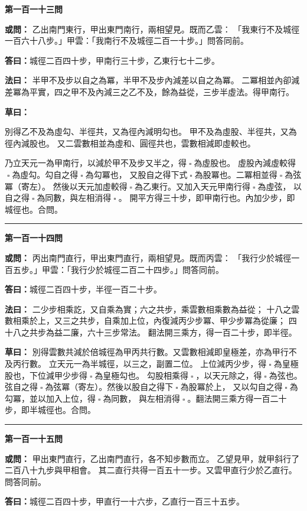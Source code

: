 \documentclass[11pt,a4paper]{article}
\let\origsquare\square
\renewcommand{\square}{\ensuremath{\origsquare}}%
\newcommand{\longline}{\noindent\rule{\textwidth}{0.4pt}}
\newcommand{\owen}[1]{%
  \par\vspace{0.4em}%
  \noindent\textcolor{problemcolor}{\textbf{或問：}}{\tradfont #1}\par\nopagebreak%
}
\newcommand{\fayue}[1]{%
  \par\noindent\textcolor{methodcolor}{\textbf{法曰：}}{\tradfont #1}\par\nopagebreak%
}
\newcommand{\tsaoyue}[1]{%
  \par\noindent\textcolor{workcolor}{\textbf{草曰：}}{\tradfont #1}\par%
}
\newcommand{\dayue}[1]{%
  \par\noindent\textcolor{anscolor}{\textbf{答曰：}}{\tradfont #1}\par\nopagebreak%
}
\newcommand{\wen}[1]{\par\vspace{0.3em}\noindent\textcolor{problemcolor}{\textbf{第#1問}}\par}
\begin{document}
\wen{一百一十三}
\owen{%
乙出南門東行，甲出東門南行，兩相望見。既而乙雲：
「我東行不及城徑一百六十八步。」甲雲：「我南行不及城徑二百一十步。」問答同前。}
\dayue{城徑二百四十步，甲南行三十步，乙東行七十二步。}

\fayue{%
半甲不及步以自之為冪，半甲不及步內減差以自之為冪。
二冪相並內卻減差冪為平實，四之甲不及內減三之乙不及，餘為益從，三步半虛法。得甲南行。}

\tsaoyue{%
別得乙不及為虛勾、半徑共，又為徑內減明勾也。
甲不及為虛股、半徑共，又為徑內減股也。
又二雲數相並為虛和、圓徑共也，雲數相減即虛較也。

乃立天元一為甲南行，以減於甲不及步又半之，得$ \; \square \; $為虛股也。
虛股內減虛較得$ \; \square \; $為虛勾。勾自之得$ \; \square \; $為勾冪也，
又股自之得下式$ \; \square \; $為股冪也。二冪相並得$ \; \square \; $為弦冪（寄左）。
然後以天元加虛較得$ \; \square \; $為乙東行。又加入天元甲南行得$ \; \square \; $為虛弦，
以自之得$ \; \square \; $為同數，與左相消得$ \; \square \; $。
開平方得三十步，即甲南行也。內加少步，即城徑也。合問。}

\vspace{0.5cm}
\begin{center}
\longline
\end{center}

\wen{一百一十四}
\owen{%
丙出南門直行，甲出東門直行，兩相望見。既而丙雲：
「我行少於城徑一百五步。」甲雲：「我行少於城徑二百二十四步。」問答同前。}
\dayue{城徑二百四十步，半徑一百二十步。}

\fayue{%
二少步相乘訖，又自乘為實；六之共步，乘雲數相乘數為益從；
十八之雲數相乘於上，又三之共步，自乘加上位，內復減丙少步冪、甲少步冪為從廉；
四十八之共步為益二廉，六十三步常法。
翻法開三乘方，得一百二十步，即半徑。}

\tsaoyue{%
別得雲數共減於倍城徑為甲丙共行數。又雲數相減即皇極差，亦為甲行不及丙行數。
立天元一為半城徑，以三之，副置二位。
上位減丙少步，得$ \; \square \; $為皇極股也，下位減甲少步得$ \; \square \; $為皇極勾也。
勾股相乘得$ \; \square \; $，以天元除之，得$ \; \square \; $為弦也。
弦自之得$ \; \square \; $為弦冪（寄左）。然後以股自之得下$ \; \square \; $為股冪於上，
又以勾自之得$ \; \square \; $為勾冪，並以加入上位，得$ \; \square \; $為同數，
與左相消得$ \; \square \; $。翻法開三乘方得一百二十步，即半城徑也。合問。}

\vspace{0.5cm}
\begin{center}
\longline
\end{center}

\wen{一百一十五}
\owen{%
甲出東門直行，乙出南門直行，各不知步數而立。
乙望見甲，就甲斜行了二百八十九步與甲相會。
其二直行共得一百五十一步。又雲甲直行少於乙直行。問答同前。}
\dayue{城徑二百四十步，甲直行一十六步，乙直行一百三十五步。}
\end{document}
